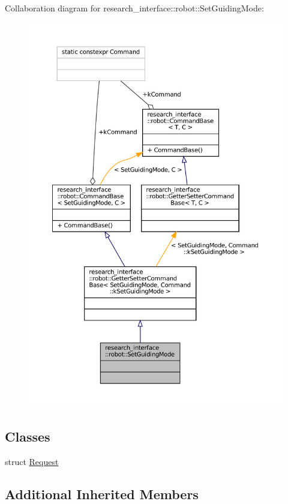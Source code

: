 Collaboration diagram for research\+\_\+interface\+:\+:robot\+:\+:Set\+Guiding\+Mode\+:
\nopagebreak
\begin{figure}[H]
\begin{center}
\leavevmode
\includegraphics[width=350pt]{structresearch__interface_1_1robot_1_1SetGuidingMode__coll__graph}
\end{center}
\end{figure}
\subsection*{Classes}
\begin{DoxyCompactItemize}
\item 
struct \hyperlink{structresearch__interface_1_1robot_1_1SetGuidingMode_1_1Request}{Request}
\end{DoxyCompactItemize}
\subsection*{Additional Inherited Members}


